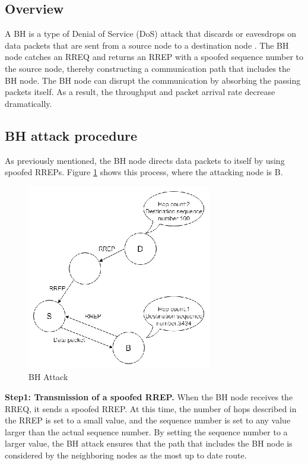 \documentclass[conference]{IEEEtran}
\begin{document}
\subsection{Overview}
A BH is a type of Denial of Service (DoS) attack that discards or eavesdrops on data packets that are sent from a source node to a destination node \cite{3, 4}. The BH node catches an RREQ and returns an RREP with a spoofed sequence number to the source node, thereby constructing a communication path that includes the BH node. The BH node can disrupt the communication by absorbing the passing packets itself. As a result, the throughput and packet arrival rate decrease dramatically.

\subsection{BH attack procedure}
As previously mentioned, the BH node directs data packets to itself by using spoofed RREPs. Figure \ref{fig:bhAttack} shows this process, where the attacking node is B.

\begin{figure}[htb]
\centering
\includegraphics[scale=1.7]{BH_Attack}
\caption{BH Attack}
\label{fig:bhAttack}
\end{figure}


\textbf{Step1: Transmission of a spoofed RREP.} When the BH node receives the RREQ, it sends a spoofed RREP. At this time, the number of hops described in the RREP is set to a small value, and the sequence number is set to any value larger than the actual sequence number. By setting the sequence number to a larger value, the BH attack ensures that the path that includes the BH node is considered by the neighboring nodes as the most up to date route.
\end{document}
